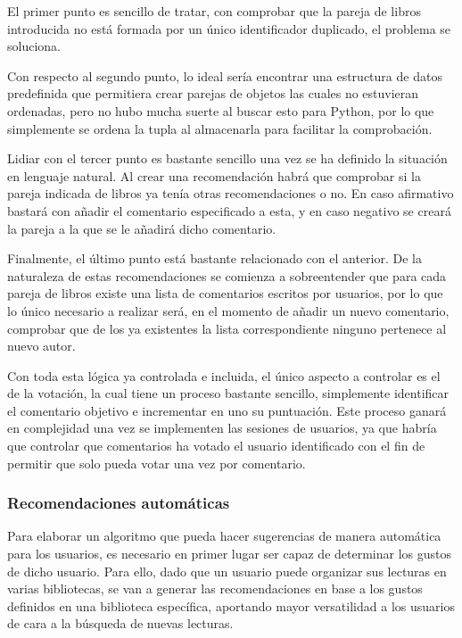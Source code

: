 El primer punto es sencillo de tratar, con comprobar que la pareja de libros introducida no está formada por un único identificador duplicado, el problema se soluciona.

Con respecto al segundo punto, lo ideal sería encontrar una estructura de datos predefinida que permitiera crear parejas de objetos las cuales no estuvieran ordenadas, pero no hubo mucha suerte al buscar esto para Python, por lo que simplemente se ordena la tupla al almacenarla para facilitar la comprobación.

Lidiar con el tercer punto es bastante sencillo una vez se ha definido la situación en lenguaje natural. Al crear una recomendación habrá que comprobar si la pareja indicada de libros ya tenía otras recomendaciones o no. En caso afirmativo bastará con añadir el comentario especificado a esta, y en caso negativo se creará la pareja a la que se le añadirá dicho comentario.

Finalmente, el último punto está bastante relacionado con el anterior. De la naturaleza de estas recomendaciones se comienza a sobreentender que para cada pareja de libros existe una lista de comentarios escritos por usuarios, por lo que lo único necesario a realizar será, en el momento de añadir un nuevo comentario, comprobar que de los ya existentes la lista correspondiente ninguno pertenece al nuevo autor.

Con toda esta lógica ya controlada e incluida, el único aspecto a controlar es el de la votación, la cual tiene un proceso bastante sencillo, simplemente identificar el comentario objetivo e incrementar en uno su puntuación. Este proceso ganará en complejidad una vez se implementen las sesiones de usuarios, ya que habría que controlar que comentarios ha votado el usuario identificado con el fin de permitir que solo pueda votar una vez por comentario.

\subsubsection{Recomendaciones automáticas}

Para elaborar un algoritmo que pueda hacer sugerencias de manera automática para los usuarios, es necesario en primer lugar ser capaz de determinar los gustos de dicho usuario. Para ello, dado que un usuario puede organizar sus lecturas en varias bibliotecas, se van a generar las recomendaciones en base a los gustos definidos en una biblioteca específica, aportando mayor versatilidad a los usuarios de cara a la búsqueda de nuevas lecturas.

